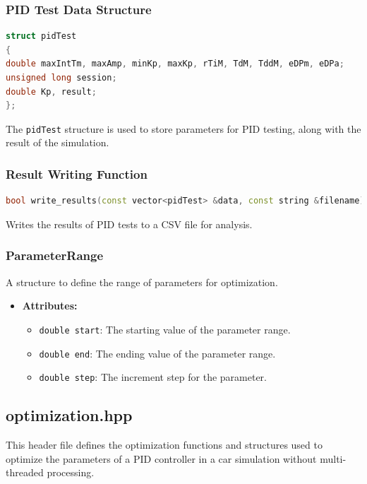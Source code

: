 \documentclass[a4paper,12pt]{article}
\begin{document}
\subsubsection{PID Test Data Structure}
\begin{lstlisting}[language=cpp]
struct pidTest
{
double maxIntTm, maxAmp, minKp, maxKp, rTiM, TdM, TddM, eDPm, eDPa;
unsigned long session;
double Kp, result;
};
\end{lstlisting}
The \texttt{pidTest} structure is used to store parameters for PID testing, along with the result of the simulation.
\subsubsection{Result Writing Function}
\begin{lstlisting}[language=cpp]
bool write_results(const vector<pidTest> &data, const string &filename)
\end{lstlisting}
Writes the results of PID tests to a CSV file for analysis.
\subsubsection{ParameterRange}
A structure to define the range of parameters for optimization.
\begin{itemize}
\item \textbf{Attributes:}
\begin{itemize}
\item \texttt{double start}: The starting value of the parameter range.
\item \texttt{double end}: The ending value of the parameter range.
\item \texttt{double step}: The increment step for the parameter.
\end{itemize}
\end{itemize}
\subsection{optimization.hpp}
This header file defines the optimization functions and structures used to optimize the parameters of a PID controller in a car simulation without multi-threaded processing.
\end{document}
